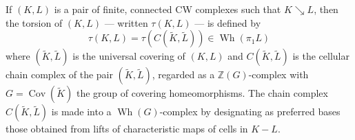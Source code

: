 If $(K, L)$ is a pair of finite, connected CW complexes such that $K \searrow L$, then the torsion of $(K, L)$ — written $\tau(K, L)$ — is defined by
$$
\tau(K, L) = \tau(C(\widetilde{K}, \widetilde{L})) \in \operatorname{Wh}(\pi_1 L)
$$
where $(\widetilde{K}, \widetilde{L})$ is the universal covering of $(K, L)$ and $C(\widetilde{K}, \widetilde{L})$ is the cellular chain complex of the pair $(\widetilde{K}, \widetilde{L})$, regarded as a $\mathbb{Z}(G)$-complex with $G = \operatorname{Cov}(\widetilde{K})$ the group of covering homeomorphisms. The chain complex $C(\widetilde{K}, \widetilde{L})$ is made into a $\operatorname{Wh}(G)$-complex by designating as preferred bases those obtained from lifts of characteristic maps of cells in $K - L$.
